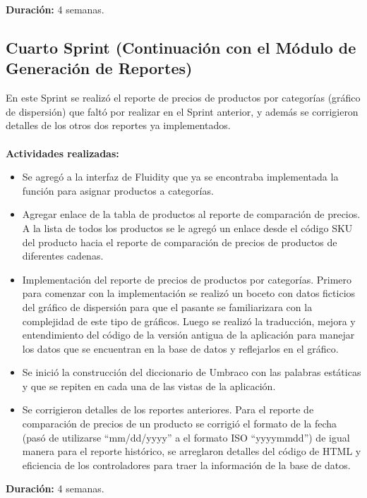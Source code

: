 \textbf{Duración:} 4 semanas.

\subsection{Cuarto Sprint (Continuación con el Módulo de Generación de Reportes)}

En este Sprint se realizó el reporte de precios de productos por categorías (gráfico de dispersión) que faltó por realizar en el Sprint anterior, y además se corrigieron detalles de los otros dos reportes ya implementados.
\\
\\
\textbf{Actividades realizadas:}
\begin{itemize}
   \item Se agregó a la interfaz de Fluidity que ya se encontraba implementada la función para asignar productos a categorías.
   \item Agregar enlace de la tabla de productos al reporte de comparación de precios. A la lista de todos los productos se le agregó un enlace desde el código SKU del producto hacia el reporte de comparación de precios de productos de diferentes cadenas.
   \item Implementación del reporte de precios de productos por categorías. Primero para comenzar con la implementación se realizó un boceto con datos ficticios del gráfico de dispersión para que el pasante se familiarizara con la complejidad de este tipo de gráficos. Luego se realizó la traducción, mejora y entendimiento del código de la versión antigua de la aplicación para manejar los datos que se encuentran en la base de datos y reflejarlos en el gráfico.
   \item Se inició la construcción del diccionario de Umbraco con las palabras estáticas y que se repiten en cada una de las vistas de la aplicación.
   \item Se corrigieron detalles de los reportes anteriores. Para el reporte de comparación de precios de un producto se corrigió el formato de la fecha (pasó  de utilizarse “mm/dd/yyyy” a el formato ISO “yyyymmdd”) de igual manera para el reporte histórico, se arreglaron detalles del código de HTML y eficiencia de los controladores para traer la información de la base de datos.
\end{itemize}

\textbf{Duración:} 4 semanas.


